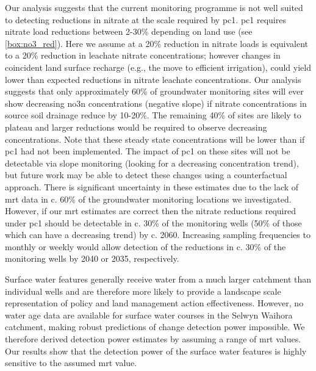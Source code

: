 Our analysis suggests that the current monitoring programme is not well suited to detecting reductions in nitrate at the scale required by \gls{pc1}.
\gls{pc1} requires nitrate load reductions between 2-30\% depending on land use (see \autoref{box:no3_red}).
Here we assume at a 20\% reduction in nitrate loads is equivalent to a 20\% reduction in leachate nitrate concentrations; however changes in coincident land surface recharge (e.g., the move to efficient irrigation), could yield lower than expected reductions in nitrate leachate concentrations.
Our analysis suggests that only approximately 60\% of groundwater monitoring sites will ever show decreasing \gls{no3n} concentrations (negative slope) if nitrate concentrations in source soil drainage reduce by 10-20\%.
The remaining 40\% of sites are likely to plateau and larger reductions would be required to observe decreasing concentrations.
Note that these steady state concentrations will be lower than if \gls{pc1} had not been implemented.
The impact of \gls{pc1} on these  sites will not be detectable via slope monitoring (looking for a decreasing concentration trend), but future work may be able to detect these changes using a counterfactual approach.
There is significant uncertainty in these estimates due to the lack of \gls{mrt} data in c. 60\% of the groundwater monitoring locations we investigated.
However, if our \gls{mrt} estimates are correct then the nitrate reductions required under \gls{pc1} should be detectable in c. 30\% of the monitoring wells (50\% of those which can have a decreasing trend) by c. 2060.
Increasing sampling frequencies to monthly or weekly would allow detection of the reductions in c. 30\% of the monitoring wells by 2040 or 2035, respectively.

Surface water features generally receive water from a much larger catchment than individual wells and are therefore more likely to provide a landscape scale representation of policy and land management action effectiveness.
However, no water age data are available for surface water courses in the Selwyn Waihora catchment, making robust predictions of change detection power impossible.
We therefore derived detection power estimates by assuming a range of \gls{mrt} values.
Our results show that the detection power of the surface water features is highly sensitive to the assumed \gls{mrt} value.

